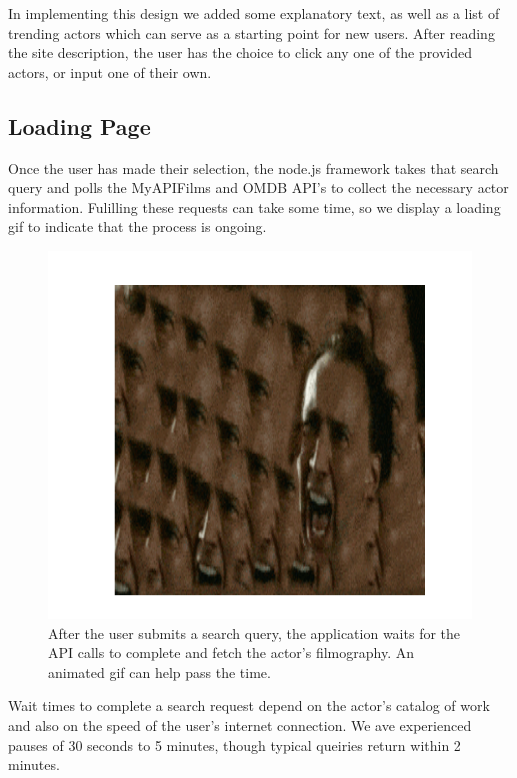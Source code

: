 \documentclass[12pt]{article}
\begin{document}
In implementing this design we added some explanatory text, as well as a list of trending actors which can serve as a starting point for new users.  After reading the site description, the user has the choice to click any one of the provided actors, or input one of their own.

\subsection{Loading Page}

Once the user has made their selection, the node.js framework takes that search query and polls the MyAPIFilms and OMDB API's to collect the necessary actor information.  Fulilling these requests can take some time, so we display a loading gif to indicate that the process is ongoing.

			\begin{figure}[h!]
				\centering
				\includegraphics[scale=0.3]{images/loadingPage.png}
				\caption{After the user submits a search query, the application waits for the API calls to complete and fetch the actor's filmography. An animated gif can help pass the time.}
			\end{figure}

Wait times to complete a search request depend on the actor's catalog of work and also on the speed of the user's internet connection.  We ave experienced pauses of 30 seconds to 5 minutes, though typical queiries return within 2 minutes.
\end{document}
